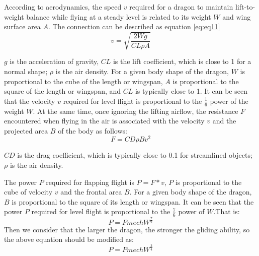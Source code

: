 \documentclass[12pt]{article}  %
\newenvironment{shrinkeq}[1]
{ \bgroup
	\addtolength\abovedisplayshortskip{#1}
	\addtolength\abovedisplayskip{#1}
	\addtolength\belowdisplayshortskip{#1}
	\addtolength\belowdisplayskip{#1}}
{\egroup\ignorespacesafterend}
\begin{document}
According to aerodynamics, the speed $v$ required for a dragon to maintain lift-to-weight balance while flying at a steady level is related to its weight $W$ and wing surface area $A$. The connection can be described as equation \eqref{eq:eq11}
\begin{shrinkeq}{-1ex}
	\begin{equation}
    \label{eq:eq11}
	   v = \sqrt{\frac{2Wg}{CL\rho A}}
	\end{equation}
\end{shrinkeq}

$g$ is the acceleration of gravity, $CL$ is the lift coefficient, which is close to 1 for a normal shape; $\rho$ is the air density. For a given body shape of the dragon, $W$ is proportional to the cube of the length or wingspan, $A$ is proportional to the square of the length or wingspan, and $CL$ is typically close to 1. It can be seen that the velocity $v$ required for level flight is proportional to the $\frac{1}{6}$ power of the weight $W$. At the same time, once ignoring the lifting airflow, the resistance $F$ encountered when flying in the air is associated with the velocity $v$ and the projected area $B$ of the body as follows:
\begin{shrinkeq}{-1ex}
	\begin{equation}
    \label{eq:eq12}
	   F = CD\rho Bv^2
	\end{equation}
\end{shrinkeq}

$CD$ is the drag coefficient, which is typically close to 0.1 for streamlined objects; $\rho$ is the air density.

The power $P$ required for flapping flight is $P=F*v$, $P$ is proportional to the cube of velocity $v$ and the frontal area $B$. For a given body shape of the dragon, $B$ is proportional to the square of its length or wingspan. It can be seen that the power $P$ required for level flight is proportional to the $\frac{7}{6}$ power of $W$.That is:
\begin{shrinkeq}{-1ex}
	\begin{equation}
    \label{eq:eq13}
	   P = Pmech W^{\frac{7}{6}}
	\end{equation}
\end{shrinkeq}
Then we consider that the larger the dragon, the stronger the gliding ability, so the above equation should be modified as:
\begin{shrinkeq}{-1ex}
	\begin{equation}
    \label{eq:eq13}
	   P = Pmech W^{\frac{3}{4}}
	\end{equation}
\end{shrinkeq}
\end{document}
